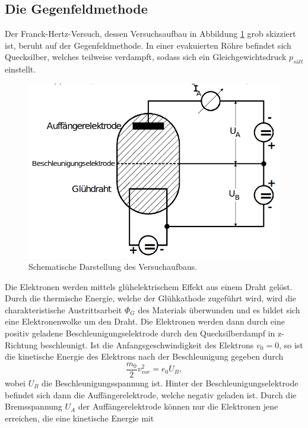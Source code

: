 \subsection{Die Gegenfeldmethode}
\label{sec:gegen}
Der Franck-Hertz-Versuch, dessen Versuchsaufbau in Abbildung \ref{fig:skizze} grob skizziert ist, beruht auf der Gegenfeldmethode.
In einer evakuierten Röhre befindet sich Quecksilber, welches teilweise verdampft, sodass sich ein Gleichgewichtsdruck $p_{sätt}$
einstellt.
\begin{figure}[H]
    \centering
    \includegraphics[scale = 0.5]{pictures/Aufbau1.png}
    \caption{Schematische Darstellung des Versuchaufbaus. \cite{AP01}}
    \label{fig:skizze}
\end{figure}
\noindent
Die Elektronen werden mittels glühelektrischem Effekt aus einem Draht gelöst. Durch die thermische Energie, welche der
Glühkathode zugeführt wird, wird die charakteristische Austrittsarbeit $\Phi_G$ des Materials überwunden und es bildet sich eine
Elektronenwolke um den Draht. Die Elektronen werden dann durch eine positiv geladene Beschleunigungselektrode durch den Quecksilberdampf
in z-Richtung beschleunigt. Ist die Anfangsgeschwindigkeit des Elektrons $v_0=0$, so ist die kinetische Energie des Elektrons nach der
Beschleunigung gegeben durch
\begin{equation*}
    \frac{m_0}{2}v_{vor}^2=e_0U_B   ,
\end{equation*}
wobei $U_B$ die Beschleunigungsspannung ist.
Hinter der Beschleunigungselektrode befindet sich dann die Auffängerelektrode, welche negativ geladen ist. Durch die Bremsspannung
$U_A$ der Auffängerelektrode können nur die Elektronen jene erreichen, die eine kinetische Energie mit
